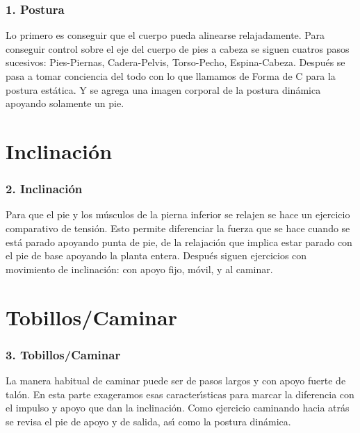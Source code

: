 \documentclass{beamer}
\begin{document}
\begin{frame}
\frametitle{1. Postura}

Lo primero es conseguir que el cuerpo pueda alinearse
relajadamente. Para conseguir control sobre el eje del cuerpo
de pies a cabeza se siguen cuatros pasos sucesivos:
Pies-Piernas, Cadera-Pelvis, Torso-Pecho, Espina-Cabeza.
Después se pasa a tomar conciencia del todo con lo que
llamamos de Forma de C para la postura estática. Y se
agrega una imagen corporal de la postura dinámica
apoyando solamente un pie.

% 
\end{frame}

\section{Inclinación}

\begin{frame}
\frametitle{2. Inclinación}

Para que el pie y los músculos de la pierna inferior se relajen 
se hace un ejercicio comparativo de tensión. Esto permite
diferenciar la fuerza que se hace cuando se está parado
apoyando punta de pie, de la relajación que implica estar
parado con el pie de base apoyando la planta entera.
Después siguen ejercicios con movimiento de inclinación: con
apoyo fijo, móvil, y al caminar.
\end{frame}


\section{Tobillos/Caminar}
\begin{frame}
\frametitle{3. Tobillos/Caminar}
La manera habitual de caminar puede ser de pasos largos y        
con apoyo fuerte de talón. En esta parte exageramos esas
caracterı́sticas para marcar la diferencia con el impulso y
apoyo que dan la inclinación. Como ejercicio caminando
hacia atrás se revisa el pie de apoyo y de salida, ası́ como la
postura dinámica.
\end{frame}
\end{document}
